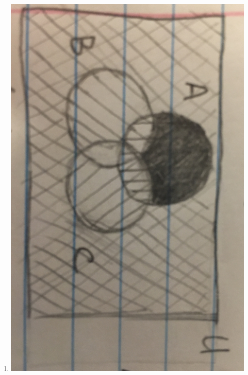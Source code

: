 \documentclass{article}
\theoremstyle{definition}
\begin{document}
\begin{enumerate}[label = \alph*)]
    \item 
    \includegraphics[scale = .045, angle = 90]{partA}
    

\end{enumerate}
\end{document}
